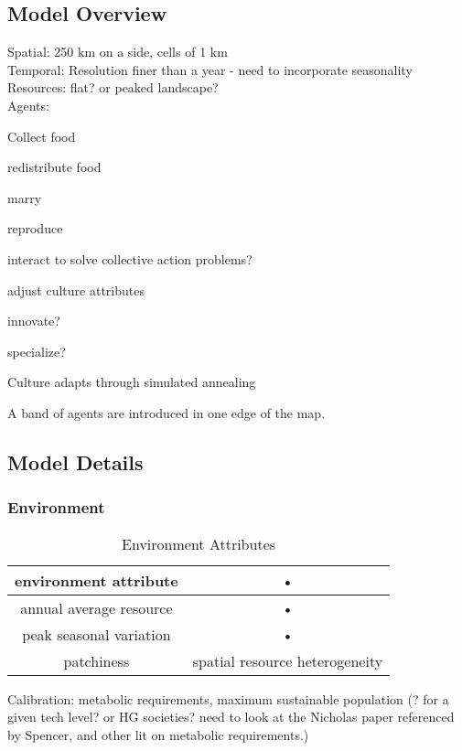\documentclass[11pt,oneside,a4paper,onecolumn]{article}
\begin{document}
\subsection{Model Overview}
Spatial: 250 km on a side, cells of 1 km\\
Temporal:  Resolution finer than a year - need to incorporate seasonality\\
Resources:  flat?  or peaked landscape?\\
Agents:
\begin{itemize*}
	\item Collect food
	\item redistribute food
	\item marry
	\item reproduce
	\item interact to solve collective action problems?
	\item adjust culture attributes
	\item innovate?
	\item specialize?
\end{itemize*}
Culture adapts through simulated annealing

A band of agents are introduced in one edge of the map.

\subsection{Model Details}

\subsubsection{Environment}
\begin{table}[h!]
	\centering
	\begin{tabular}{|c|c|}
	\hline 
	\textbf{environment attribute} & • \\ 
	\hline 
	annual average resource & • \\ 
	\hline 
	peak seasonal variation & • \\ 
	\hline 
	patchiness & spatial resource heterogeneity \\
	\hline
	\end{tabular}
	\label{environment attributes}
	\caption{Environment Attributes} 
\end{table}

Calibration:  metabolic requirements, maximum sustainable population (?  for a given tech level?  or HG societies?  need to look at the Nicholas paper referenced by Spencer, and other lit on metabolic requirements.)
\end{document}
